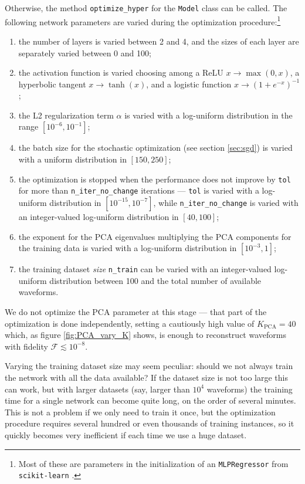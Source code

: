\documentclass[main.tex]{subfiles}
\begin{document}
Otherwise, the method \texttt{optimize\_hyper} for the \texttt{Model} class can be called. 
The following network parameters are varied during the optimization procedure:\footnote{Most of these are parameters in the initialization of an \texttt{MLPRegressor} from \texttt{scikit-learn} \cite{pedregosaScikitlearnMachineLearning2011}.}
\begin{enumerate}
    \item the number of layers is varied between 2 and 4, and the sizes of each layer are separately varied between 0 and 100;
    \item the activation function is varied choosing among a \ac{ReLU} \(x \to \max(0, x)\), a hyperbolic tangent \(x 
\to \tanh(x)\), and a logistic function \(x \to (1 + e^{-x})^{-1}\);
    \item the L2 regularization term \(\alpha \) is varied with a log-uniform distribution in the range \([10^{-6}, 10^{-1}]\);
    \item the batch size for the stochastic optimization (see section \ref{sec:sgd}) is varied with a uniform distribution in \([150, 250]\);
    \item the optimization is stopped when the performance does not improve by \texttt{tol} for more than \texttt{n\_iter\_no\_change} iterations --- \texttt{tol} is varied with a log-uniform distribution in \([10^{-15}, 10^{-7}]\), while \texttt{n\_iter\_no\_change} is varied with an integer-valued log-uniform distribution in \([40, 100]\);
    \item the exponent for the \ac{PCA} eigenvalues multiplying the \ac{PCA} components for the training data is varied with a log-uniform distribution in \([10^{-3}, 1]\);
    \item the training dataset \emph{size} \texttt{n\_train} can be varied with an integer-valued log-uniform distribution between 100 and the total number of available waveforms.
\end{enumerate}

We do not optimize the \ac{PCA} parameter at this stage --- that part of the optimization is done independently, setting a cautiously high value of \(K_{\text{PCA}} = 40\) which, as figure \ref{fig:PCA_vary_K} shows, is enough to reconstruct waveforms with fidelity \(\mathcal{F} \lesssim 10^{-8}\). 

Varying the training dataset size may seem peculiar: should we not always train the network with all the data available? 
If the dataset size is not too large this can work, but with larger datasets (say, larger than \(10^4\) waveforms) the training time for a single network can become quite long, on the order of several minutes. 
This is not a problem if we only need to train it once, but the optimization procedure requires several hundred or even thousands of training instances, so it quickly becomes very inefficient if each time we use a huge dataset. 
\end{document}
